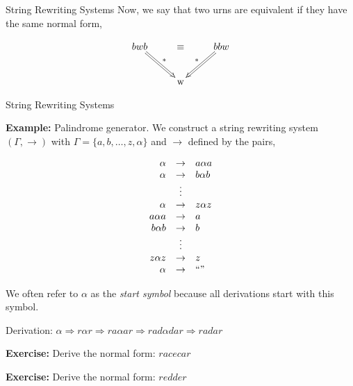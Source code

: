 \documentclass{beamer}
\begin{document}
\begin{frame}[fragile]{String Rewriting Systems}
Now, we say that two urns are equivalent if they have the same normal form,

{\small
\[
\xymatrix{
bwb \ar@{=>}[rd]^{*} &\equiv &bbw\ar@{=>}[ld]_{*}  \\
&\mbox{w}&
}
\]
}
\end{frame}

\begin{frame}[fragile]{String Rewriting Systems}

\small
{\bf Example:} Palindrome generator.  We construct a string rewriting system $(\Gamma,\rightarrow)$ with
$\Gamma = \{a,b,\ldots,z, \alpha\}$ and $\rightarrow$ defined by the pairs,
\begin{minipage}{2in}
\[
\begin{array}{rcl}
\alpha & \rightarrow & a \alpha a\\
\alpha & \rightarrow & b \alpha b\\
& \vdots&\\
\alpha &\rightarrow& z \alpha z\\
a\alpha a & \rightarrow & a\\
b\alpha b & \rightarrow & b\\
& \vdots&\\
z\alpha z & \rightarrow & z\\
\alpha &\rightarrow& ``"
\end{array}
\]
\end{minipage}
\begin{minipage}{2in}
We often refer to $\alpha$ as the {\em start symbol} because all derivations start with this symbol.
\end{minipage}

\vspace{.1in}

Derivation: $\alpha \Rightarrow r \alpha r \Rightarrow r a \alpha a r \Rightarrow r a d \alpha d a r \Rightarrow r a d a r$

\vspace{.1in}


{\bf Exercise:} Derive the normal form: $racecar$

{\bf Exercise:} Derive the normal form: $redder$

\end{frame}
\end{document}
